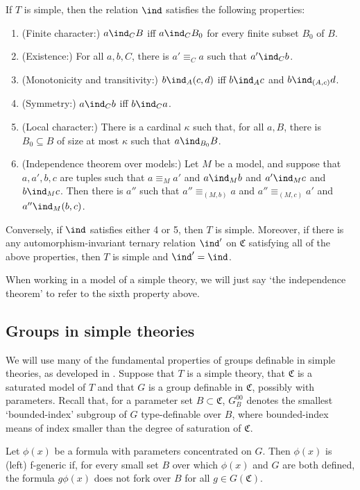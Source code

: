 \documentclass[10pt]{article}
\begin{document}
{\begin{fact}\label{kim_pillay}
    If $T$ is simple, then the relation $\ind$ satisfies the following properties:
    \begin{enumerate}
        \item (Finite character:) $a\ind_C B$ iff $a\ind_C B_0$ for every finite subset $B_0$ of $B$.
        \item (Existence:) For all $a,b,C$, there is $a'\equiv_C a$ such that $a'\ind_Cb$.
        \item (Monotonicity and transitivity:) $b\ind_A (c,d)$ iff $b\ind_{A}c$ and $b\ind_{(A,c)}d$.
        \item (Symmetry:) $a\ind_C b$ iff $b\ind_C a$.
        \item (Local character:) There is a cardinal $\kappa$ such that, for all $a,B$, there is $B_0\subseteq B$ of size at most $\kappa$ such that $a\ind_{B_0}B$.
        \item (Independence theorem over models:) Let $M$ be a model, and suppose that $a,a',b,c$ are tuples such that $a\equiv_M a'$ and $a\ind_M b$ and $a'\ind_M c$ and $b\ind_M c$. Then there is $a''$ such that $a''\equiv_{(M,b)}a$ and $a''\equiv_{(M,c)}a'$ and $a''\ind_M(b,c)$.
    \end{enumerate}Conversely, if $\ind$ satisfies either 4 or 5, then $T$ is simple. Moreover, if there is any automorphism-invariant ternary relation $\ind'$ on $\mathfrak{C}$ satisfying all of the above properties, then $T$ is simple and $\ind'=\ind$.
\end{fact} When working in a model of a simple theory, we will just say `the independence theorem' to refer to the sixth property above.

\subsection{Groups in simple theories}\label{groups_simple_thys_sec}
We will use many of the fundamental properties of groups definable in simple theories, as developed in \cite{pillay}. Suppose that $T$ is a simple theory, that $\mathfrak{C}$ is a saturated model of $T$ and that $G$ is a group definable in $\mathfrak{C}$, possibly with parameters. Recall that, for a parameter set $B\subset\mathfrak{C}$, $G^{00}_B$ denotes the smallest `bounded-index' subgroup of $G$ type-definable over $B$, where bounded-index means of index smaller than the degree of saturation of $\mathfrak{C}$.


\begin{definition}
    Let $\phi(x)$ be a formula with parameters concentrated on $G$. Then $\phi(x)$ is (left) f-generic if, for every small set $B$ over which $\phi(x)$ and $G$ are both defined, the formula $g\phi(x)$ does not fork over $B$ for all $g\in G(\mathfrak{C})$.
\end{definition}

}
\end{document}
